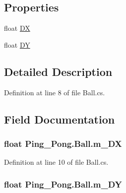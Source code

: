 \subsection*{Properties}
\begin{DoxyCompactItemize}
\item 
float \hyperlink{class_ping___pong_1_1_ball_af3e8f435dbdb315523fd1bebb2032374}{D\-X}
\item 
float \hyperlink{class_ping___pong_1_1_ball_a733b32b50c29c5c39e8a94654f9e3309}{D\-Y}
\end{DoxyCompactItemize}


\subsection{Detailed Description}


Definition at line 8 of file Ball.\-cs.



\subsection{Field Documentation}
\hypertarget{class_ping___pong_1_1_ball_abc4e830bbb71be51ce46b48cf2bd7df2}{
\subsubsection[{m\-\_\-\-D\-X}]{\setlength{\rightskip}{0pt plus 5cm}float Ping\-\_\-\-Pong.\-Ball.\-m\-\_\-\-D\-X\hspace{0.3cm}{\ttfamily [protected]}}}\label{class_ping___pong_1_1_ball_abc4e830bbb71be51ce46b48cf2bd7df2}


Definition at line 10 of file Ball.\-cs.

\hypertarget{class_ping___pong_1_1_ball_a9b4627b61b519fd2ed089a277403a356}{
\subsubsection[{m\-\_\-\-D\-Y}]{\setlength{\rightskip}{0pt plus 5cm}float Ping\-\_\-\-Pong.\-Ball.\-m\-\_\-\-D\-Y\hspace{0.3cm}{\ttfamily [protected]}}}\label{class_ping___pong_1_1_ball_a9b4627b61b519fd2ed089a277403a356}


